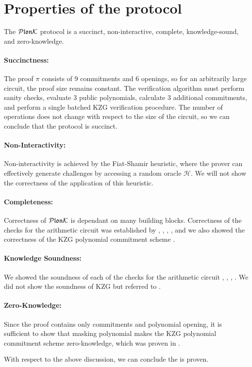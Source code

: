 \section{Properties of the protocol}

\begin{theorem}
    \label{main-theorem}
    The $\mathcal{P}\mathfrak{lon}\mathcal{K}$ protocol is a succinct, non-interactive, complete, knowledge-sound, and zero-knowledge.
\end{theorem}

\paragraph{Succinctness:} The proof $\pi$ consists of 9 commitments and 6 openings, so for an arbitrarily large circuit, the proof size remains constant. The verification algorithm must perform sanity checks, evaluate 3 public polynomials, calculate 3 additional commitments, and perform a single batched KZG verification procedure. The number of operations does not change with respect to the size of the circuit, so we can conclude that the protocol is succinct.

\paragraph{Non-Interactivity:} Non-interactivity is achieved by the Fiat-Shamir heuristic, where the prover can effectively generate challenges by accessing a random oracle $\mathcal{H}$. We will not show the correctness of the application of this heuristic.

\paragraph{Completeness:} Correctness of $\mathcal{P}\mathfrak{lon}\mathcal{K}$ is dependant on many building blocks. Correctness of the checks for the arithmetic circuit was established by , , , , and we also showed the correctness of the KZG polynomial commitment scheme .

\paragraph{Knowledge Soundness:} We showed the soundness of each of the checks for the arithmetic circuit , , , . We did not show the soundness of KZG but referred to \cite{ProofArgsAndZk}.

\paragraph{Zero-Knowledge:} Since the proof contains only commitments and polynomial opening, it is sufficient to show that masking polynomial makes the KZG polynomial commitment scheme zero-knowledge, which was proven in .

With respect to the above discussion, we can conclude the  is proven. 

